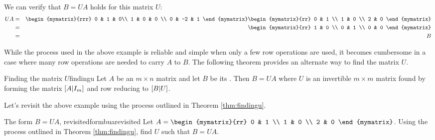 \begin{solution}
We can verify that $B = UA$ holds for this matrix $U$:
\begin{eqnarray*}
UA &=& \begin{mymatrix}{rrr}
0 & 1 & 0\\
1 & 0 & 0 \\
0 & -2  & 1 
\end{mymatrix}
\begin{mymatrix}{rr}
0 & 1 \\
1 & 0 \\
2 & 0
\end{mymatrix} \\
&=& \begin{mymatrix}{rr}
1 & 0 \\
0 & 1 \\
0 & 0 
\end{mymatrix} \\
&=& B 
\end{eqnarray*} 
\end{solution}

While the process used in the above example is reliable and simple when only a few row operations are used, it becomes cumbersome in a case where many row operations are needed to carry $A$ to $B$. The following theorem provides an alternate way to find the matrix $U$. 

\begin{theorem}{Finding the matrix $U$}{findingu}
Let $A$ be an $m \times n$ matrix and let $B$ be its {\rref}. Then $B = UA$ where $U$ is an invertible $m \times m$ matrix found by forming the matrix $ \left[A | I_m \right]$ and row reducing to $\left[B | U \right]$. 
\end{theorem}

Let's revisit the above example using the process outlined in Theorem \ref{thm:findingu}.

\begin{example}{The form $B=UA$, revisited}{formbuarevisited}
Let $A = \begin{mymatrix}{rr} 
0 & 1 \\
1 & 0 \\
2 & 0 
\end{mymatrix}$. Using the process outlined in Theorem \ref{thm:findingu}, find $U$ such that $B=UA$. 
\end{example}

